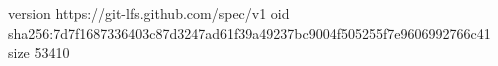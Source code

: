 version https://git-lfs.github.com/spec/v1
oid sha256:7d7f1687336403c87d3247ad61f39a49237bc9004f505255f7e9606992766c41
size 53410
